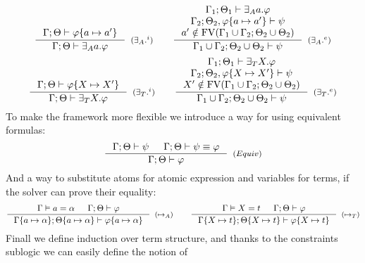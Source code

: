 \documentclass[english, mgr]{iithesis}
\begin{document}
\begin{eqnarray*}
  \inference{
    \jgmnt[\cEnv;\Theta]{\formphi \{\atomv \mapsto \atomv'\}}
    }{
    \jgmnt[\cEnv;\Theta]{\fExistsAtom{\atomv}\formphi}
  }[(\ensuremath{{\fExistsAtom{}}^i})]
  \qquad
  \inference{
    \jgmnt[\cEnv_1;\Theta_1]{\fExistsAtom{\atomv}\formphi} \\
    \jgmnt[\cEnv_2;\Theta_2,\formphi \{\atomv \mapsto \atomv'\}]{\psi} \\
    \atomv' \notin \fv[\cEnv_1 \cup \cEnv_2;\Theta_2 \cup \Theta_2]
    }{
    \jgmnt[\cEnv_1 \cup \cEnv_2;\Theta_2 \cup \Theta_2]{\psi}
  }[(\ensuremath{{\fExistsAtom{}}^e})]
\end{eqnarray*}
\begin{eqnarray*}
  \inference{
    \jgmnt[\cEnv;\Theta]{\formphi \{\termv \mapsto \termv'\}}
    }{
    \jgmnt[\cEnv;\Theta]{\fExistsTerm{\termv}\formphi}
  }[(\ensuremath{{\fExistsTerm{}}^i})]
  \qquad
  \inference{
    \jgmnt[\cEnv_1;\Theta_1]{\fExistsTerm{\termv}\formphi} \\
    \jgmnt[\cEnv_2;\Theta_2,\formphi \{\termv \mapsto \termv'\}]{\psi} \\
    \termv' \notin \fv[\cEnv_1 \cup \cEnv_2;\Theta_2 \cup \Theta_2]
    }{
    \jgmnt[\cEnv_1 \cup \cEnv_2;\Theta_2 \cup \Theta_2]{\psi}
  }[(\ensuremath{{\fExistsTerm{}}^e})]
\end{eqnarray*}
To make the framework more flexible we introduce a way for using equivalent formulas:
\begin{eqnarray*}
  \inference{
    \jgmnt[\cEnv;\Theta]{\psi} &
    \jgmnt[\cEnv;\Theta]{\psi \equiv \formphi}
    }{
    \jgmnt[\cEnv;\Theta]{\formphi}
  }[(\ensuremath{Equiv})]
\end{eqnarray*}
And a way to substitute atoms for atomic expression and variables for terms, if the solver can prove their equality:
\begin{eqnarray*}
  \inference{
    \cjgmnt[\cEnv]{\atomv \ceq \atomexp} &
    \jgmnt[\cEnv;\Theta]{\formphi}
    }{
    \jgmnt[\cEnv\{\atomv \mapsto \atomexp\};\Theta\{\atomv \mapsto \atomexp\}]{\formphi\{\atomv \mapsto \atomexp\}}
  }[(\ensuremath{\mapsto_A})]
\qquad
  \inference{
    \cjgmnt[\cEnv]{\termv \ceq \term} &
    \jgmnt[\cEnv;\Theta]{\formphi}
    }{
    \jgmnt[\cEnv\{\termv \mapsto \term\};\Theta\{\termv \mapsto \term\}]{\formphi\{\termv \mapsto \term\}}
  }[(\ensuremath{\mapsto_T})]
\end{eqnarray*}
Finall we define induction over term structure,
and thanks to the constraints sublogic we can easily define the notion of
\end{document}
